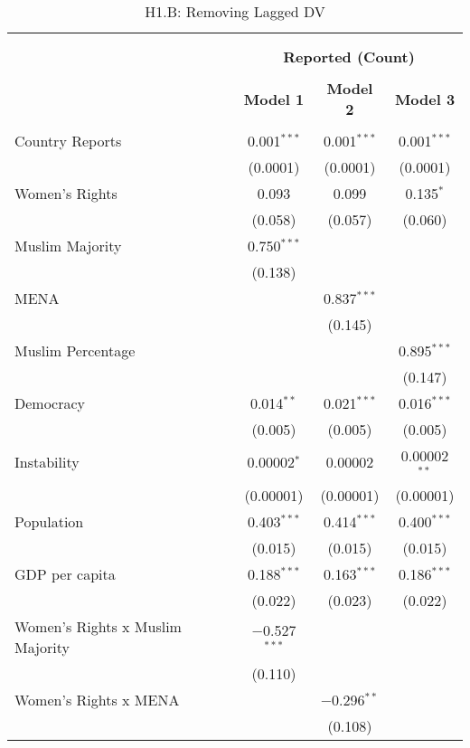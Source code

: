 
\begin{table}[!htbp] \centering 
  \caption{H1.B: Removing Lagged DV} 
  \label{} 
\begin{tabular}{@{\extracolsep{5pt}}lccc} 
\\[-1.8ex]\hline \\[-1.8ex] 
\\[-1.8ex] & \multicolumn{3}{c}{\textbf{Reported (Count)}} \\ 
\\[-1.8ex] & \textbf{Model 1} & \textbf{Model 2} & \textbf{Model 3}\\ 
\hline \\[-1.8ex] 
 Country Reports & 0.001$^{***}$ & 0.001$^{***}$ & 0.001$^{***}$ \\ 
  & (0.0001) & (0.0001) & (0.0001) \\ 
  Women's Rights & 0.093 & 0.099 & 0.135$^{*}$ \\ 
  & (0.058) & (0.057) & (0.060) \\ 
  Muslim Majority & 0.750$^{***}$ &  &  \\ 
  & (0.138) &  &  \\ 
  MENA &  & 0.837$^{***}$ &  \\ 
  &  & (0.145) &  \\ 
  Muslim Percentage &  &  & 0.895$^{***}$ \\ 
  &  &  & (0.147) \\ 
  Democracy & 0.014$^{**}$ & 0.021$^{***}$ & 0.016$^{***}$ \\ 
  & (0.005) & (0.005) & (0.005) \\ 
  Instability & 0.00002$^{*}$ & 0.00002 & 0.00002$^{**}$ \\ 
  & (0.00001) & (0.00001) & (0.00001) \\ 
  Population & 0.403$^{***}$ & 0.414$^{***}$ & 0.400$^{***}$ \\ 
  & (0.015) & (0.015) & (0.015) \\ 
  GDP per capita & 0.188$^{***}$ & 0.163$^{***}$ & 0.186$^{***}$ \\ 
  & (0.022) & (0.023) & (0.022) \\ 
  Women's Rights x Muslim Majority & $-$0.527$^{***}$ &  &  \\ 
  & (0.110) &  &  \\ 
  Women's Rights x MENA &  & $-$0.296$^{**}$ &  \\ 
  &  & (0.108) &  \\ 

\end{tabular}
\end{table}
